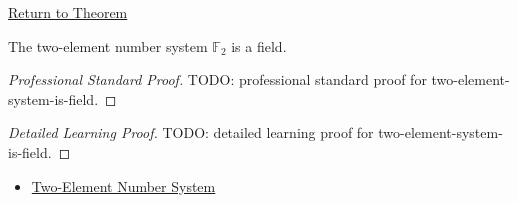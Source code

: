 \newpage
{}
\label{prf:two-element-system-is-field}

\begin{remark*}[Return]
\hyperref[thm:two-element-system-is-field]{Return to Theorem}
\end{remark*}

\begin{theorem*}
The two-element number system \(\mathbb{F}_2\) is a field.
\end{theorem*}

\begin{proof}[Professional Standard Proof]
\LRAProofBodyStart
TODO: professional standard proof for two-element-system-is-field.
\end{proof}

\begin{proof}[Detailed Learning Proof]
\LRAProofBodyStart
TODO: detailed learning proof for two-element-system-is-field.
\end{proof}

\begin{remark*}
\end{remark*}

\begin{dependencies}
\begin{itemize}
  \item \hyperref[def:two-element-number-system]{Two-Element Number System}
\end{itemize}
\end{dependencies}

\clearpage
